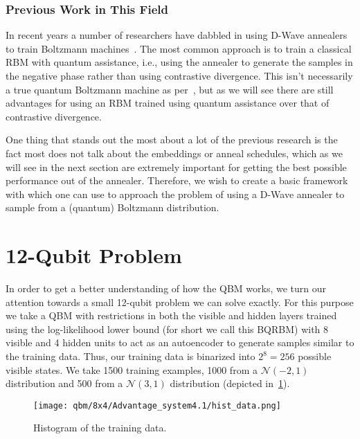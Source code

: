\subsubsection{Previous Work in This Field}
In recent years a number of researchers have dabbled in using D-Wave annealers to train Boltzmann machines~\cite{adachi_2015,benedetti_2016,anschuetz_2019,wiebe_2019,rocutto_2020,dixit_2021,ilmo_2021,wilson_2021}.
The most common approach is to train a classical RBM with quantum assistance, i.e., using the annealer to generate the samples in the negative phase rather than using contrastive divergence.
This isn't necessarily a true quantum Boltzmann machine as per~\cite{amin_2018}, but as we will see there are still advantages for using an RBM trained using quantum assistance over that of contrastive divergence.

One thing that stands out the most about a lot of the previous research is the fact most does not talk about the embeddings or anneal schedules, which as we will see in the next section are extremely important for getting the best possible performance out of the annealer.
Therefore, we wish to create a basic framework with which one can use to approach the problem of using a D-Wave annealer to sample from a (quantum) Boltzmann distribution.

\section{12-Qubit Problem}
In order to get a better understanding of how the QBM works, we turn our attention towards a small 12-qubit problem we can solve exactly.
For this purpose we take a QBM with restrictions in both the visible and hidden layers trained using the log-likelihood lower bound (for short we call this BQRBM) with 8 visible and 4 hidden units to act as an autoencoder to generate samples similar to the training data.
Thus, our training data is binarized into \( 2^8 = 256 \) possible visible states.
We take 1500 training examples, 1000 from a \( \mathcal{N}(-2, 1) \) distribution and 500 from a \( \mathcal{N}(3, 1) \) distribution (depicted in~\cref{fig:hist_data}).

\begin{figure}[!htb]
    \begin{center}
        \texttt{[image: qbm/8x4/Advantage\_system4.1/hist\_data.png]}
    \end{center}
    \caption{Histogram of the training data.}
    \label{fig:hist_data}
\end{figure}


